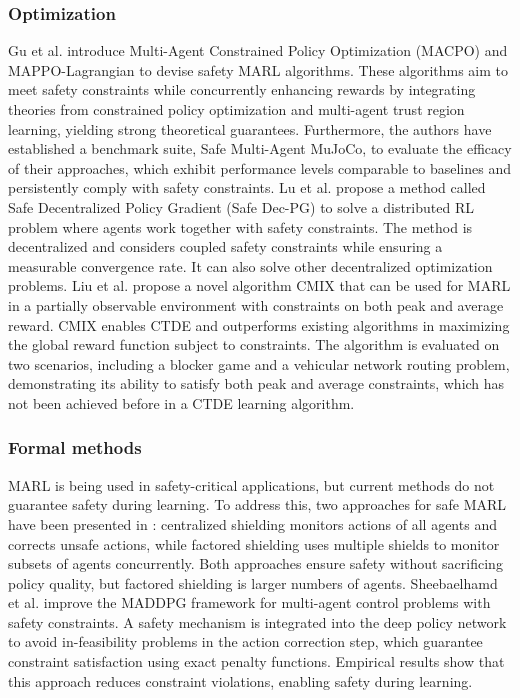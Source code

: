 \documentclass[acmsmall]{acmart}
\begin{document}
\subsubsection{Optimization}
Gu et al. \cite{gu2021multi} introduce Multi-Agent Constrained Policy Optimization (MACPO) and MAPPO-Lagrangian to devise safety MARL algorithms. These algorithms aim to meet safety constraints while concurrently enhancing rewards by integrating theories from constrained policy optimization and multi-agent trust region learning, yielding strong theoretical guarantees. Furthermore, the authors have established a benchmark suite, Safe Multi-Agent MuJoCo, to evaluate the efficacy of their approaches, which exhibit performance levels comparable to baselines and persistently comply with safety constraints.
Lu et al. \cite{lu2021decentralized} propose a method called Safe Decentralized Policy Gradient (Safe Dec-PG) to solve a distributed RL problem where agents work together with safety constraints. The method is decentralized and considers coupled safety constraints while ensuring a measurable convergence rate. It can also solve other decentralized optimization problems.
Liu et al. \cite{10.1007/978-3-030-86486-6_10} propose a novel algorithm CMIX that can be used for MARL in a partially observable environment with constraints on both peak and average reward. CMIX enables CTDE and outperforms existing algorithms in maximizing the global reward function subject to constraints. The algorithm is evaluated on two scenarios, including a blocker game and a vehicular network routing problem, demonstrating its ability to satisfy both peak and average constraints, which has not been achieved before in a CTDE learning algorithm. %
\subsubsection{Formal methods}
MARL is being used in safety-critical applications, but current methods do not guarantee safety during learning. To address this, two approaches for safe MARL have been presented in \cite{elsayed2021safe}: centralized shielding monitors actions of all agents and corrects unsafe actions, while factored shielding uses multiple shields to monitor subsets of agents concurrently. Both approaches ensure safety without sacrificing policy quality, but factored shielding is larger numbers of agents.
Sheebaelhamd et al. \cite{sheebaelhamd2021safe} improve the MADDPG framework for multi-agent control problems with safety constraints. A safety mechanism is integrated into the deep policy network to avoid in-feasibility problems in the action correction step, which guarantee constraint satisfaction using exact penalty functions. Empirical results show that this approach reduces constraint violations, enabling safety during learning.
\end{document}
